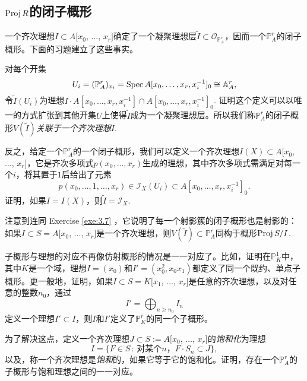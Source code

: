 \subsection{\texorpdfstring{$\operatorname{Proj} R$}{Proj R}的闭子概形}\label{s:3.2.2}

一个齐次理想$I\subset A[x_0$, $\dots$, $x_r]$确定了一个凝聚理想层$\tilde I\subset \mathscr O_{\mathbb P_A^r}$，因而一个$\mathbb P_A^r$的闭子概形。下面的习题建立了这些事实。

\begin{exe}\label{exe:3.13}
对每个开集
\[
	U_i=(\mathbb P_A^r)_{x_i}=\operatorname{Spec} A[x_0,\dots,x_r,x_i^{-1}]_0\cong \mathbb A_A^r,
\]
令$\tilde I(U_i)$为理想$I\cdot A[x_0,\dots,x_r,x_i^{-1}]\cap A[x_0,\dots,x_r,x_i^{-1}]_0$. 证明这个定义可以以唯一的方式扩张到其他开集$U$上使得$\tilde{I}$成为一个凝聚理想层。所以我们称$\mathbb P_A^r$的闭子概形$V(\tilde{I})$\textit{关联于一个齐次理想$I$}.
\end{exe}

\begin{exe}\label{exe:3.14}
反之，给定一个$\mathbb P_A^r$的一个闭子概形，我们可以定义一个齐次理想$I(X)\subset A[x_0$, $\dots$, $x_r]$，它是齐次多项式$p(x_0,\dots,x_r)$生成的理想，其中齐次多项式需满足对每一个$i$，将其置于$1$后给出了元素
\[
	p(x_0,\dots,1,\dots,x_r)\in \mathscr I_X(U_i)\subset A[x_0,\dots,x_r,x_i^{-1}]_0.
\]
证明，如果$I=I(X)$，则$\tilde I=\mathscr I_X$.
\end{exe}

注意到连同 Exercise \ref{exe:3.7} ，它说明了每一个射影簇的闭子概形也是射影的：如果$I\subset S=A[x_0$, $\dots$, $x_r]$是一个齐次理想，则$V(\tilde{I})\subset \mathbb P^r_A$同构于概形$\operatorname{Proj} S/I$.

\begin{exe}\label{exe:3.15}
子概形与理想的对应不再像仿射概形的情况是一一对应了。比如，证明在$\mathbb P_K^1$中，其中$K$是一个域，理想$I=(x_0)$和$I'=(x_0^2,x_0x_1)$都定义了同一个既约、单点子概形。更一般地，证明，如果$I\subset S=K[x_1$, $\dots$, $x_r]$是任意的齐次理想，以及对任意的整数$n_0$，通过
\[
	I'=\bigoplus_{n\geq n_0}I_n
\]
定义一个理想$I'\subset I$，则$I$和$I'$定义了$\mathbb P_K^r$的同一个子概形。
\end{exe}

\begin{exe}\label{exe:3.16}
为了解决这点，定义一个齐次理想$J\subset S:=A[x_0$, $\dots$, $x_r]$的\textit{饱和化}为理想
\[
	I=\{F\in S\,:\, \text{对某个$n$，$F\cdot S_n\subset J$}\},
\]
以及，称一个齐次理想是\textit{饱和}的，如果它等于它的饱和化。证明，存在一个$\mathbb P_A^r$的子概形与饱和理想之间的一一对应。
\end{exe}

